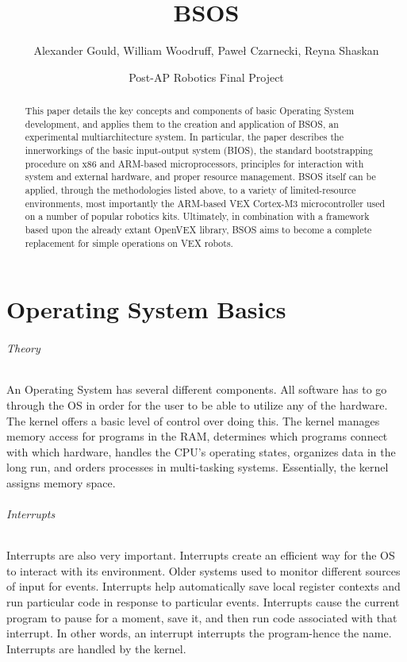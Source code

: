 \documentclass[english]{paper}
\begin{document}
\title{BSOS}


\author{Alexander Gould, William Woodruff, Pawe\l{} Czarnecki, Reyna Shaskan}


\date{Post-AP Robotics Final Project}
\maketitle
\begin{abstract}
This paper details the key concepts and components of basic Operating System development, and applies them to the creation and application of BSOS, an experimental multiarchitecture system. In particular, the paper describes the innerworkings of the basic input-output system (BIOS), the standard bootstrapping procedure on x86 and ARM-based microprocessors, principles for interaction with system and external hardware, and proper resource management. BSOS itself can be applied, through the methodologies listed above, to a variety of limited-resource environments, most importantly the ARM-based VEX Cortex-M3 microcontroller used on a number of popular robotics kits. Ultimately, in combination with a framework based upon the already extant OpenVEX library, BSOS aims to become a complete replacement for simple operations on VEX robots.
\end{abstract}

\part{Operating System Basics}
\paragraph{Theory}
An Operating System has several different components. All software has to go through the OS in order for the user to be able to utilize any of the hardware. The kernel offers a basic level of control over doing this. The kernel manages memory access for programs in the RAM, determines which programs connect with which hardware, handles the CPU's operating states, organizes data in the long run, and orders processes in multi-tasking systems. Essentially, the kernel assigns memory space.

\paragraph{Interrupts}
Interrupts are also very important. Interrupts create an efficient way for the OS to interact with its environment. Older systems used to monitor different sources of input for events. Interrupts help automatically save local register contexts and run particular code in response to particular events. Interrupts cause the current program to pause for a moment, save it, and then run code associated with that interrupt. In other words, an interrupt interrupts the program-hence the name. Interrupts are handled by the kernel.
\end{document}
